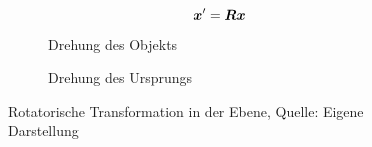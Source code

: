 \begin{equation}
    \boldsymbol{x}^\prime = \boldsymbol{R}\boldsymbol{x} \label{eq:rotation_2d_a10}
\end{equation}
\begin{figure}[H]
    \centering
    \begin{subfigure}[b]{0.45\textwidth}
        
        \caption{Drehung des Objekts}\label{fig:rotation_2d_a}
    \end{subfigure}
    \begin{subfigure}[b]{0.45\textwidth}
        
        \caption{Drehung des Ursprungs}\label{fig:rotation_2d_b}
    \end{subfigure}
    \caption[Rotatorische Transformation in der Ebene]{Rotatorische Transformation in der Ebene, Quelle: Eigene Darstellung}\label{fig:rotation_2d}
\end{figure}
